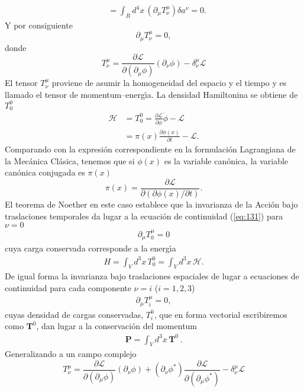 \begin{frame}
\begin{align}
  &=\int_{R}d^4x\,
  \left(
    \partial_\mu T^\mu_\nu
  \right)\delta a^\nu=0.
\end{align}
Y por consiguiente
\begin{equation}
  \label{eq:131}
  \partial_\mu T^\mu_\nu=0,
\end{equation}
donde
\begin{equation}
  \label{eq:tmunu}
    T^\mu_\nu=\frac{\partial\mathcal{L}}{\partial(\partial_\mu\phi)}(\partial_\nu\phi)
      -\delta^\mu_\nu\mathcal{L}
\end{equation}
El tensor $T^\mu_\nu$ proviene de asumir la homogeneidad del espacio y el tiempo y es llamado el tensor de momentum--energ\'\i a. 
La densidad Hamiltonina se obtiene de $T^0_0$
\begin{align}
  \label{eq:3}
\mathcal{H}&=T^0_0=\frac{\partial\mathcal{L}}{\partial\dot{\phi}}\dot{\phi}
      -\mathcal{L}\\
      &=\pi(x)\frac{\partial\phi(x)}{\partial t}-\mathcal{L}.
\end{align}
Comparando con la expresi\'on correspondiente en la formulaci\'on
Lagrangiana de la Mec\'anica Cl\'asica, tenemos que si $\phi(x)$ es la
variable can\'onica, la variable can\'onica conjugada es $\pi(x)$
\begin{equation}
  \label{eq:4}
  \pi(x)=\frac{\partial\mathcal{L}}{\partial(\partial\phi(x)/\partial t)}.
\end{equation}
El teorema de Noether en este caso establece que la invarianza de la Acci\'on bajo traslaciones temporales da lugar a la ecuaci\'on de continuidad (\ref{eq:131}) para $\nu=0$
\begin{align}
\label{eq:122}
  \partial_\mu T^\mu_0=0
\end{align}
cuya carga conservada corresponde a la energ\'\i a
\begin{align}
  H=\int_V d^3x\, T^0_0=\int_V d^3x\,\mathcal{H}.
\end{align}
De igual forma la invarianza bajo traslaciones espaciales de lugar a ecuaciones de continuidad para cada componente $\nu=i$
 ($i=1,2,3$)
 \begin{align}
   \label{eq:235}
   \partial_\mu T^\mu_i=0,
 \end{align}
cuyas densidad de cargas conservadas, $T^0_i$, que en forma vectorial escribiremos como $\mathbf{T}^0$, dan lugar a la conservaci\'on del momentum
\begin{align}
  \mathbf{P}=\int_V d^3x\,\mathbf{T}^0\,.
\end{align}
Generalizando a un campo complejo
\begin{equation}
  \label{eq:138}
     T^\mu_\nu=\frac{\partial\mathcal{L}}{\partial(\partial_\mu\phi)}(\partial_\nu\phi)+(\partial_\nu\phi^*)\frac{\partial\mathcal{L}}{\partial(\partial_\mu\phi^*)}
      -\delta^\mu_\nu\mathcal{L}
\end{equation}
\end{frame}
